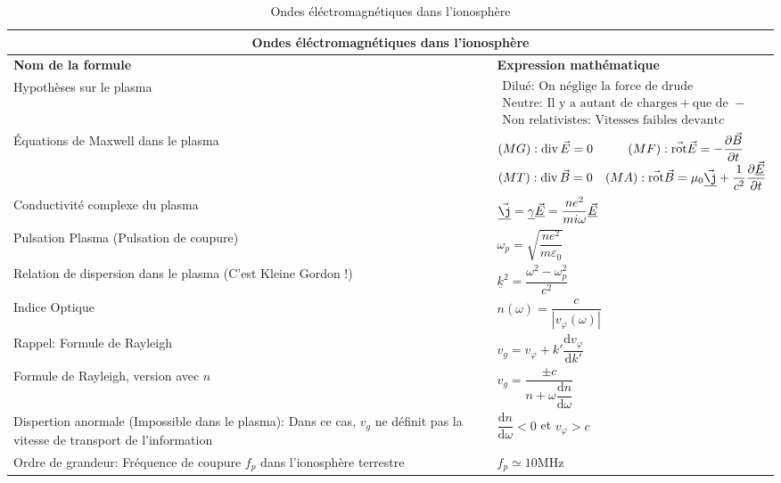 \documentclass[10pt,a4paper,titlepage,portrait]{article}
\renewcommand{\d}
{
    \mathrm{d}
}
\newcommand*{\dv}[2]
{
    \dfrac{\d#1}{\d#2}
}
\newcommand*{\dpv}[2]
{
    \dfrac{\partial#1}{\partial#2}
}
\newcommand{\rot}
{
    \vec{\operatorname{rot}}
}
\renewcommand{\div}
{
    \operatorname{div}
}
\renewcommand{\arraystretch}{2}
\begin{document}
\begin{table}[H]
    \centering
    \renewcommand{\arraystretch}{1.5} %
    \setlength{\tabcolsep}{8pt} %
    \begin{tabular}{@{}p{9cm}p{10cm}@{}}
        \toprule
        \multicolumn{2}{c}{\textbf{Ondes éléctromagnétiques dans l'ionosphère}} \\
        \midrule
        \textbf{Nom de la formule} & \textbf{Expression mathématique} \\
        \midrule
        Hypothèses sur le plasma & $\begin{array}{l}\text{Dilué: On néglige la force de drude} \\ \text{Neutre: Il y a autant de charges} + \text{que de } - \\ \text{Non relativistes: Vitesses faibles devant} c\end{array}$ \\
        Équations de Maxwell dans le plasma & $\begin{matrix}(MG): \div \vec{E} = 0 & (MF): \rot\vec{E} = -\dpv{\vec{B}}{t} \\ (MT): \div \vec{B} = 0 & (MA): \rot \vec{B} = \mu_0 \underline {\vec \j} + \dfrac{1}{c^2}\dpv{\underline {\vec E}}{t}\end{matrix}$ \\
        Conductivité complexe du plasma & $\underline {\vec \j} = \underline \gamma \underline {\vec E}  = \dfrac{ne^2}{mi\omega} \underline {\vec E}$ \\
        Pulsation Plasma (Pulsation de coupure) & $\omega_p = \sqrt{\dfrac{ne^2}{m\varepsilon_0}}$ \\
        Relation de dispersion dans le plasma (C'est Kleine Gordon !)& $\underline k ^2 = \dfrac{\omega^2 - \omega_p^2}{c^2}$ \\
        Indice Optique & $n(\omega) = \dfrac{c}{|v_{\varphi}(\omega)|}$ \\
        Rappel: Formule de Rayleigh & $v_g = v_{\varphi} + k'\dv{v_{\varphi}}{k'}$ \\
        Formule de Rayleigh, version avec $n$ & $v_g = \dfrac{\pm c}{n+\omega\dv{n}{\omega}}$ \\ 
        Dispertion anormale (Impossible dans le plasma): Dans ce cas, $v_g$ ne définit pas la vitesse de transport de l'information & $\dv{n}{\omega} < 0$ et $v_{\varphi} > c$\\
        Ordre de grandeur: Fréquence de coupure $f_p$ dans l'ionosphère terrestre & $f_p \simeq \num{10}\unit{\MHz}$ \\
    \bottomrule
\end{tabular}
\caption{Ondes éléctromagnétiques dans l'ionosphère}
\label{tab:ohm_iono}
\end{table}
\end{document}
